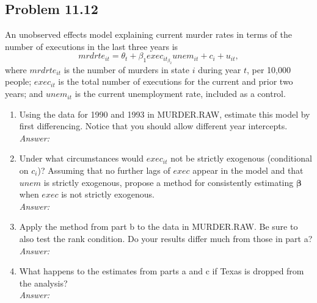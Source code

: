 \documentclass[10pt]{article}
\begin{document}
\subsection*{Problem 11.12}
An unobserved effects model explaining current murder rates in terms of the number of executions in the last three years is
\[mrdrte_{it}=\theta_t+\beta_1exec_{it}_\beta_2unem_{it}+c_i+u_{it},\]
where $mrdrte_{it}$ is the number of murders in state $i$ during year $t$, per 10,000 people; $exec_{it}$ is the total number of executions for the current and prior two years; and $unem_{it}$ is the current unemployment rate, included as a control.
\begin{enumerate}[label=\alph*.]
\item Using the data for 1990 and 1993 in MURDER.RAW, estimate this model by first differencing. Notice that you should allow different year intercepts.
\\ \textit{Answer:}\\

\item Under what circumstances would $exec_{it}$ not be strictly exogenous (conditional on $c_i$)? Assuming that no further lags of $exec$ appear in the model and that $unem$ is strictly exogenous, propose a method for consistently estimating $\pmb{\beta}$ when $exec$ is not strictly exogenous.
\\\textit{Answer:}\\

\item Apply the method from part b to the data in MURDER.RAW. Be sure to also test the rank condition. Do your results differ much from those in part a? 
\\\textit{Answer:}\\

\item What happens to the estimates from parts a and c if Texas is dropped from the analysis?
\\\textit{Answer:}\\
\end{enumerate}
\end{document}
